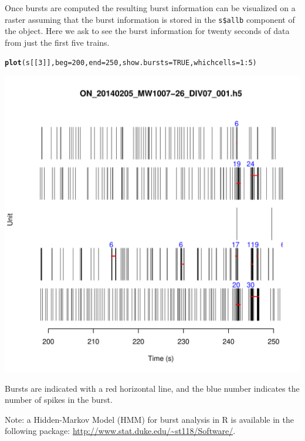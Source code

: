 \documentclass{article}\usepackage[]{graphicx}\usepackage[]{color}
\makeatletter
\def\maxwidth{ %
  \ifdim\Gin@nat@width>\linewidth
    \linewidth
  \else
    \Gin@nat@width
  \fi
}
\newcommand{\hlnum}[1]{\textcolor[rgb]{0.686,0.059,0.569}{#1}}%
\newcommand{\hlopt}[1]{\textcolor[rgb]{0,0,0}{#1}}%
\newcommand{\hlstd}[1]{\textcolor[rgb]{0.345,0.345,0.345}{#1}}%
\newcommand{\hlkwc}[1]{\textcolor[rgb]{0.333,0.667,0.333}{#1}}%
\newcommand{\hlkwd}[1]{\textcolor[rgb]{0.737,0.353,0.396}{\textbf{#1}}}%
\newenvironment{kframe}{%
 \def\at@end@of@kframe{}%
 \ifinner\ifhmode%
  \def\at@end@of@kframe{\end{minipage}}%
  \begin{minipage}{\columnwidth}%
 \fi\fi%
 \def\FrameCommand##1{\hskip\@totalleftmargin \hskip-\fboxsep
 \colorbox{shadecolor}{##1}\hskip-\fboxsep
     \hskip-\linewidth \hskip-\@totalleftmargin \hskip\columnwidth}%
 \MakeFramed {\advance\hsize-\width
   \@totalleftmargin\z@ \linewidth\hsize
   \@setminipage}}%
 {\par\unskip\endMakeFramed%
 \at@end@of@kframe}
\newenvironment{knitrout}{}{} %
\makeatother
\begin{document}
Once bursts are computed the resulting burst information can be
visualized on a raster assuming that the burst information is stored
in the \verb+s$allb+ component of the object.  Here we ask to see the
burst information for twenty seconds of data from just the first five trains.

\begin{knitrout}
\color{fgcolor}\begin{kframe}
\begin{alltt}
\hlkwd{plot}\hlstd{(s[[}\hlnum{3}\hlstd{]],} \hlkwc{beg} \hlstd{=} \hlnum{200}\hlstd{,} \hlkwc{end} \hlstd{=} \hlnum{250}\hlstd{,} \hlkwc{show.bursts} \hlstd{=} \hlnum{TRUE}\hlstd{,} \hlkwc{whichcells} \hlstd{=} \hlnum{1}\hlopt{:}\hlnum{5}\hlstd{)}
\end{alltt}
\end{kframe}
\includegraphics[width=\maxwidth]{figure/burst-raster} 

\end{knitrout}


Bursts are indicated with a red horizontal line, and the blue number
indicates the number of spikes in the burst.


Note: a Hidden-Markov Model (HMM) for burst analysis in R \citep{Tokdar2010}
is available in the following package:
\url{http://www.stat.duke.edu/~st118/Software/}.
\end{document}
